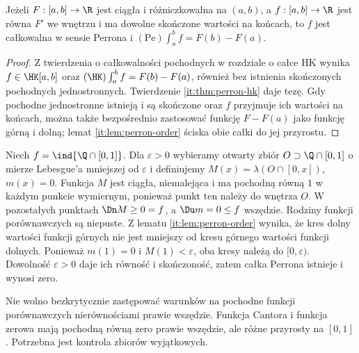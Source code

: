 \begin{stwierdzenie}
Jeżeli $F:[a,b]\to\R$ jest ciągła i różniczkowalna na $(a,b)$, a $f:[a,b]\to\R$ jest równa $F'$ we wnętrzu i ma dowolne skończone wartości na końcach, to $f$ jest całkowalna w sensie Perrona i $(\mathrm{Pe})\int_a^b f=F(b)-F(a)$.
\end{stwierdzenie}
\begin{proof}
Z twierdzenia o całkowalności pochodnych w rozdziale o całce HK wynika $f\in\HK[a,b]$ oraz $(\HK)\int_a^b f=F(b)-F(a)$, również bez istnienia skończonych pochodnych jednostronnych. Twierdzenie \ref{it:thm:perron-hk} daje tezę. Gdy pochodne jednostronne istnieją i są skończone oraz $f$ przyjmuje ich wartości na końcach, można także bezpośrednio zastosować funkcję $F-F(a)$ jako funkcję górną i dolną; lemat \ref{it:lem:perron-order} ściska obie całki do jej przyrostu.
\end{proof}
\begin{przyklad}
Niech $f=\ind{\Q\cap[0,1]}$. Dla $\varepsilon>0$ wybieramy otwarty zbiór $O\supset\Q\cap[0,1]$ o mierze Lebesgue'a mniejszej od $\varepsilon$ i definiujemy $M(x)=\lambda(O\cap[0,x])$, $m(x)=0$. Funkcja $M$ jest ciągła, niemalejąca i ma pochodną równą $1$ w każdym punkcie wymiernym, ponieważ punkt ten należy do wnętrza $O$. W pozostałych punktach $\Dn M\ge0=f$, a $\Du m=0\le f$ wszędzie. Rodziny funkcji porównawczych są niepuste. Z lematu \ref{it:lem:perron-order} wynika, że kres dolny wartości funkcji górnych nie jest mniejszy od kresu górnego wartości funkcji dolnych. Ponieważ $m(1)=0$ i $M(1)<\varepsilon$, oba kresy należą do $[0,\varepsilon)$. Dowolność $\varepsilon>0$ daje ich równość i skończoność, zatem całka Perrona istnieje i wynosi zero.
\end{przyklad}
\begin{uwaga}
Nie wolno bezkrytycznie zastępować warunków na pochodne funkcji porównawczych nierównościami prawie wszędzie. Funkcja Cantora i funkcja zerowa mają pochodną równą zero prawie wszędzie, ale różne przyrosty na $[0,1]$. Potrzebna jest kontrola zbiorów wyjątkowych.
\end{uwaga}

